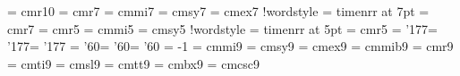     \font\tenot = cmr10\fi
\font\sevenrm  = cmr7              %
\font\seveni   = cmmi7             %
\font\sevensy  = cmsy7             %
\font\sevenex  = cmex7             %
\if!wordstyle 
    \font\sevenrm = timenrr at 7pt
    \font\sevenot = cmr7\fi
\font\fiverm    = cmr5             %
\font\fivei     = cmmi5            %
\font\fivesy    = cmsy5            %
\if!wordstyle
    \font\fiverm = timenrr at 5pt
    \font\fiveot = cmr5\fi
\skewchar\teni = '177\skewchar\seveni = '177\skewchar\fivei = '177
\skewchar\tensy = '60\skewchar\sevensy = '60\skewchar\fivesy = '60
\hyphenchar\tentt = -1
\def\tenpoint{%
    \def\rm{\fam0\tenrm}%
        \textfont0 = \tenrm\scriptfont0 = \sevenrm\scriptscriptfont0 = \fiverm%
    \textfont1 = \teni \scriptfont1 = \seveni \scriptscriptfont1 = \fivei%
    \textfont2 = \tensy\scriptfont2 = \sevensy\scriptscriptfont2 = \fivesy%
    \textfont3 = \tenex\scriptfont3 = \tenex\scriptscriptfont3 = \tenex%
    \def\it{\fam\itfam\tenit}\textfont\itfam = \tenit%
    \def\sl{\fam\slfam\tensl}\textfont\slfam = \tensl%
    \def\tt{\fam\ttfam\tentt}\textfont\ttfam = \tentt%
    \def\bf{\fam\bffam\tenbf}\textfont\bffam = \tenbf%
    \def\sc{\fam\scfam\tensc}\textfont\scfam = \tensc%
    \def\bs{\fam\bsfam\tenbs}\textfont\bsfam = \tenbs%
    \if!wordstyle
        \def\ot{\fam\otfam\tenot}%
            \textfont\otfam = \tenot%
            \scriptfont\otfam = \sevenot \scriptscriptfont\otfam = \fiveot\fi%
    \tt\ttglue = .5em plus.25em minus.15em%
    \normalbaselineskip = 12.5pt%
    \setbox\strutbox = \hbox{\vrule height8.5pt depth3.5pt width0pt}%
    \normalbaselines\rm}
%
\font\ninei  = cmmi9            %
\font\ninesy = cmsy9            %
\font\nineex = cmex9            %
\font\ninebi = cmmib9           %
\font\ninerm = cmr9             %
\font\nineit = cmti9            %
\font\ninesl = cmsl9            %
\font\ninett = cmtt9            %
\font\ninebf = cmbx9            %
\font\ninesc = cmcsc9           %
